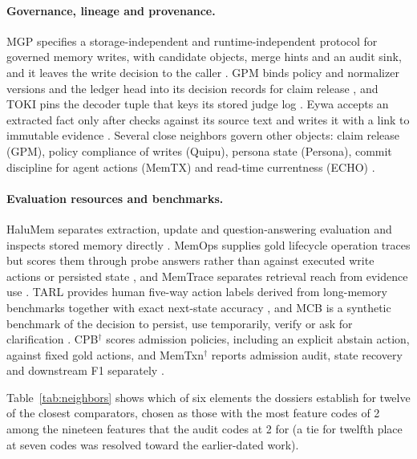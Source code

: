 \paragraph{Governance, lineage and provenance.} MGP specifies a storage-independent and runtime-independent protocol for governed memory writes, with candidate objects, merge hints and an audit sink, and it leaves the write decision to the caller \citep{mgp_hkuds_2026}. GPM binds policy and normalizer versions and the ledger head into its decision records for claim release \citep{arxiv_2608_12476}, and TOKI pins the decoder tuple that keys its stored judge log \citep{arxiv_2606_06240}. Eywa accepts an extracted fact only after checks against its source text and writes it with a link to immutable evidence \citep{arxiv_2605_30771}. Several close neighbors govern other objects: claim release (GPM), policy compliance of writes (Quipu), persona state (Persona), commit discipline for agent actions (MemTX) and read-time currentness (ECHO) \citep{arxiv_2608_12476,arxiv_2608_16813,persona_symmetry_2026,arxiv_2607_23929,arxiv_2608_21755}.

\paragraph{Evaluation resources and benchmarks.} HaluMem separates extraction, update and question-answering evaluation and inspects stored memory directly \citep{arxiv_2511_03506}. MemOps supplies gold lifecycle operation traces but scores them through probe answers rather than against executed write actions or persisted state \citep{arxiv_2607_12893}, and MemTrace separates retrieval reach from evidence use \citep{arxiv_2606_17328}. TARL provides human five-way action labels derived from long-memory benchmarks together with exact next-state accuracy \citep{arxiv_2608_03699}, and MCB is a synthetic benchmark of the decision to persist, use temporarily, verify or ask for clarification \citep{arxiv_2608_19564}. CPB$^{\dagger}$ scores admission policies, including an explicit abstain action, against fixed gold actions, and MemTxn$^{\dagger}$ reports admission audit, state recovery and downstream F1 separately \citep{arxiv_2609_30813,arxiv_2607_27834}.

Table~\ref{tab:neighbors} shows which of six \ask{} elements the dossiers establish for twelve of the closest comparators, chosen as those with the most feature codes of 2 among the nineteen features that the audit codes at 2 for \ask{} (a tie for twelfth place at seven codes was resolved toward the earlier-dated work).

